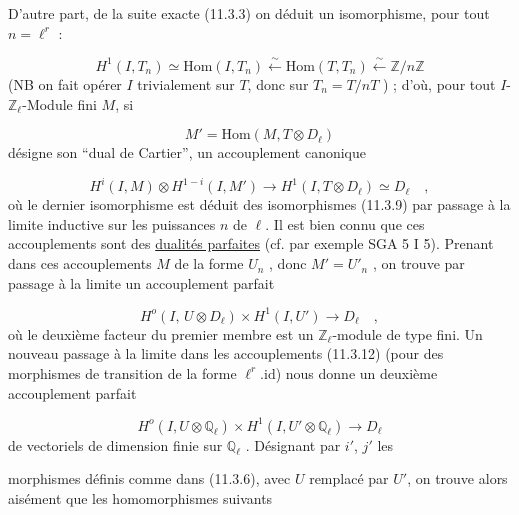 D'autre part, de la suite exacte (11.3.3) on déduit un isomorphisme, pour tout $n = \ell^r$ :

\begin{equation}\tag{11.3.9}
H^1(I,T_n) \simeq \mathrm{Hom}(I,T_n) \xleftarrow{\sim} \mathrm{Hom}(T,T_n) \xleftarrow{\sim} \mathbb{Z}/n\mathbb{Z}
\end{equation}
(NB on fait opérer $I$ trivialement sur $T$, donc sur $T_n = T/nT$ ) ; d'où, pour tout $I$-$\mathbb{Z}_\ell$-Module fini $M$, si

\begin{equation}\tag{11.3.10}
M' = \mathrm{Hom}(M, T \otimes D_\ell)
\end{equation}
désigne son ``dual de Cartier'', un accouplement canonique

\begin{equation}\tag{11.3.11}
H^i(I,M) \otimes H^{1-i}(I,M') \longrightarrow H^1(I,T \otimes D_\ell) \simeq D_\ell \quad ,
\end{equation}
où le dernier isomorphisme est déduit des isomorphismes (11.3.9) par passage à la limite inductive sur les puissances $n$ de $\ell$. Il est bien connu que ces accouplements sont des \underline{dualités parfaites} (cf. par exemple SGA 5 I 5). Prenant dans ces accouplements $M$ de la forme $U_n$ , donc $M' = U'_n$ , on trouve par passage à la limite un accouplement parfait

\begin{equation}\tag{11.3.12}
H^o(I,\, U \otimes D_\ell) \times H^1(I,U') \longrightarrow D_\ell \quad ,
\end{equation}
où le deuxième facteur du premier membre est un $\mathbb{Z}_\ell$-module de type fini. Un nouveau passage à la limite dans les accouplements (11.3.12) (pour des morphismes de transition de la forme $\ell^r.\mathrm{id}$) nous donne un deuxième accouplement parfait

\begin{equation}\tag{11.3.13}
H^o(I,U \otimes \mathbb{Q}_\ell) \times H^1(I,U' \otimes \mathbb{Q}_\ell) \longrightarrow D_\ell
\end{equation}
de vectoriels de dimension finie sur $\mathbb{Q}_\ell$ . Désignant par $i'$, $j'$ les



morphismes définis comme dans (11.3.6), avec $U$ remplacé par $U'$, on trouve alors aisément que les homomorphismes suivants

